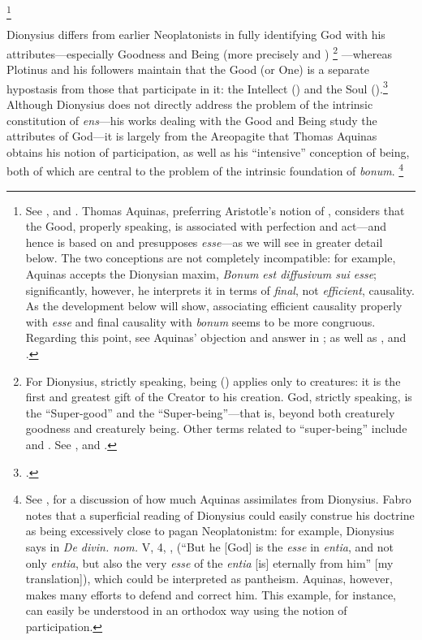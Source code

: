 {%
\footnote{See \cite[89]{fabro:nozione}, and \cite[160]{definance:connaissance}. Thomas Aquinas, preferring Aristotle's notion of , considers that the Good, properly speaking, is associated with perfection and act---and hence is based on and presupposes \emph{esse}---as we will see in greater detail below. The two conceptions are not completely incompatible: for example, Aquinas accepts the Dionysian maxim, \emph{Bonum est diffusivum sui esse}; significantly, however, he interprets it in terms of \emph{final}, not \emph{efficient}, causality. As the development below will show, associating efficient causality properly with \emph{esse} and final causality with \emph{bonum} seems to be more congruous. Regarding this point, see Aquinas' objection and answer in \cite[I, q.~5, a.~4, arg.~2 and ad 2]{st:summa}; as well as \cite[86--87]{orourke:pseudo-dionysius}, and \cite[68]{definance:etre-et-agir}.}
%

Dionysius differs from earlier Neoplatonists in fully identifying God with his attributes---especially Goodness and Being (more precisely  and )%
%
\footnote{For Dionysius, strictly speaking, being () applies only to creatures: it is the first and greatest gift of the Creator to his creation. God, strictly speaking, is the ``Super-good'' and the ``Super-being''---that is, beyond both creaturely goodness and creaturely being. Other terms related to ``super-being'' include   and . See \cite[II, 3; V, 1; and V, 5]{pg:dionysius:DN}, and \cite[69]{orourke:pseudo-dionysius}.}
%
---whereas Plotinus and his followers maintain that the Good (or One) is a separate hypostasis from those that participate in it: the Intellect () and the Soul ().\footcite[136--137]{fpascual:plotinus} Although Dionysius does not directly address the problem of the intrinsic constitution of \emph{ens}---his works dealing with the Good and Being study the attributes of God---it is largely from the Areopagite that Thomas Aquinas obtains his notion of participation, as well as his ``intensive'' conception of being, both of which are central to the problem of the intrinsic foundation of \emph{bonum}.%
%
\footnote{See \cite[90-98]{fabro:nozione}, for a discussion of how much Aquinas assimilates from Dionysius. Fabro notes that a superficial reading of Dionysius could easily construe his doctrine as being excessively close to pagan Neoplatonistm: for example, Dionysius says in \emph{De divin. nom.} V, 4, , (``But he [God] is the \emph{esse} in \emph{entia}, and not only \emph{entia}, but also the very \emph{esse} of the \emph{entia} [is] eternally from him'' [my translation]), which could be interpreted as pantheism. Aquinas, however, makes many efforts to defend and correct him. This example, for instance, can easily be understood in an orthodox way using the notion of participation.} 
%

}
